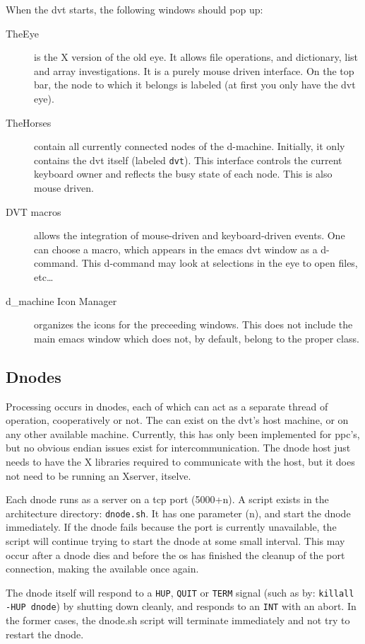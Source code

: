 \documentclass[12pt]{article}
\begin{document}
When the dvt starts, the following windows should pop up:
\begin{description}
  \item[TheEye] is the X version of the old eye.  It allows file
  operations, and dictionary, list and array investigations. It is a
  purely mouse driven interface. On the top bar, the node to which it
  belongs is labeled (at first you only have the dvt eye).
  \item[TheHorses] contain all currently connected nodes of the
  d-machine. Initially, it only contains the dvt itself (labeled
  \verb$dvt$). This interface controls the current keyboard owner and
  reflects the busy state of each node. This is also mouse driven.
  \item[DVT macros] allows the integration of mouse-driven and
  keyboard-driven events. One can choose a macro, which appears in the
  emacs dvt window as a d-command. This d-command may look at
  selections in the eye to open files, etc\dots 
  \item[d\_machine Icon Manager] organizes the icons for the
  preceeding windows. This does not include the main emacs window
  which does not, by default, belong to the proper class.
\end{description}


\subsection{Dnodes}
\label{sec:dnode}

Processing occurs in dnodes, each of which can act as a separate
thread of operation, cooperatively or not.  The can exist on the dvt's
host machine, or on any other available machine. Currently, this has
only been implemented for ppc's, but no obvious endian issues exist
for intercommunication.  The dnode host just needs to have the X
libraries required to communicate with the host, but it does not need
to be running an Xserver, itselve.

Each dnode runs as a server on a tcp port (5000+n). A script exists in
the architecture directory: \verb$dnode.sh$. It has one parameter (n),
and start the dnode immediately. If the dnode fails because the port
is currently unavailable, the script will continue trying to start the
dnode at some small interval.  This may occur after a dnode dies and
before the os has finished the cleanup of the port connection, making
the available once again.

The dnode itself will respond to a \verb$HUP$, \verb$QUIT$ or
\verb$TERM$ signal (such as by: \verb$killall -HUP dnode$) by shutting
down cleanly, and responds to an \verb$INT$ with an abort. In the
former cases, the dnode.sh script will terminate immediately and not
try to restart the dnode.
\end{document}
